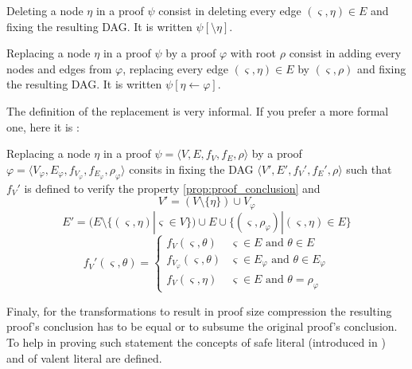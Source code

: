 \documentclass{llncs}
\newenvironment{jogo}{\color{teal}}{}
\begin{document}
\begin{definition}
Deleting a node $\eta$ in a proof $\psi$ consist in deleting every edge $(\varsigma,\eta) \in E$ and
fixing the resulting DAG. It is written $\psi[\setminus \eta]$.
\end{definition}

\begin{definition}
Replacing a node $\eta$ in a proof $\psi$ by a proof $\varphi$ with root $\rho$ consist in adding
every nodes and edges from $\varphi$, replacing every edge $(\varsigma,\eta) \in E$ by
$(\varsigma,\rho)$ and fixing the resulting DAG.  It is written $\psi[\eta \leftarrow \varphi]$.
\end{definition}

\begin{jogo}
The definition of the replacement is very informal. If you prefer a more formal one, here it is :

Replacing a node $\eta$ in a proof $\psi = \langle V,E,f_V,f_E,\rho \rangle$ by a proof $\varphi =
\langle V_\varphi,E_\varphi,f_{V_\varphi},f_{E_\varphi},\rho_\varphi \rangle$ consits in fixing the DAG
$\langle V',E',f_V',f_E',\rho \rangle$ such that $f_V'$ is defined to verify the property
\ref{prop:proof_conclusion} and
\begin{equation*}
  V' = (V \setminus \{\eta\}) \cup V_\varphi
\end{equation*}
\begin{equation*}
  E' = (E \setminus \{(\varsigma,\eta)|\varsigma \in V\}) \cup E \cup
       \{(\varsigma,\rho_\varphi)|(\varsigma,\eta) \in E\}
\end{equation*}
\begin{equation*}
  f_V'(\varsigma,\theta) = \begin{cases}
    f_V(\varsigma,\theta) & \varsigma \in E \text{ and } \theta \in E \\
    f_{V_\varphi}(\varsigma,\theta) & \varsigma \in E_\varphi \text{ and } \theta \in E_\varphi \\
    f_V(\varsigma,\eta) & \varsigma \in E \text{ and } \theta = \rho_\varphi
  \end{cases}
\end{equation*}
\end{jogo}

Finaly, for the transformations to result in proof size compression the resulting proof's conclusion
has to be equal or to subsume the original proof's conclusion. To help in proving such statement the
concepts of safe literal (introduced in \cite{RP}) and of valent literal are defined.
\end{document}
